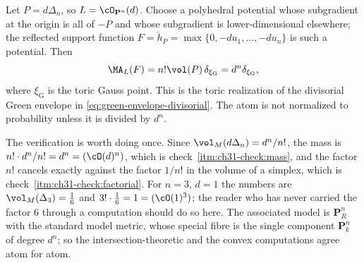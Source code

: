 \begin{example}
\label{ex:ch31-toric-atom-pn}
Let $P=d\Delta_n$, so $L=\cO_{\mathbf P^n}(d)$.  Choose a
polyhedral potential whose subgradient at the origin is all of $-P$ and
whose subgradient is lower-dimensional elsewhere; the reflected support
function $F=\check h_P=\max\{0,-du_1,\ldots,-du_n\}$ is such a potential.
Then
\[
             \MA_L(F)=n!\vol(P)\,\delta_{\xi_{\mathrm G}}
                      =d^n\delta_{\xi_{\mathrm G}},
\]
where $\xi_{\mathrm G}$ is the toric Gauss point.  This is the toric
realization of the divisorial Green envelope in
\eqref{eq:green-envelope-divisorial}.  The atom is not normalized to
probability unless it is divided by $d^n$.
\end{example}

The verification is worth doing once.  Since
$\vol_M(d\Delta_n)=d^n/n!$, the mass is
$n!\cdot d^n/n!=d^n=(\cO(d)^n)$, which is
check~\cref{itm:ch31-check:mass}, and the factor $n!$ cancels exactly
against the factor $1/n!$ in the volume of a simplex, which is
check~\cref{itm:ch31-check:factorial}.  For $n=3$, $d=1$ the numbers are
$\vol_M(\Delta_3)=\tfrac16$ and $3!\cdot\tfrac16=1=(\cO(1)^3)$; the
reader who has never carried the factor $6$ through a computation should
do so here.  The associated model is $\mathbf P^n_R$ with the standard
model metric, whose special fibre is the single component
$\mathbf P^n_k$ of degree $d^n$; so the intersection-theoretic and the
convex computations agree atom for atom.

